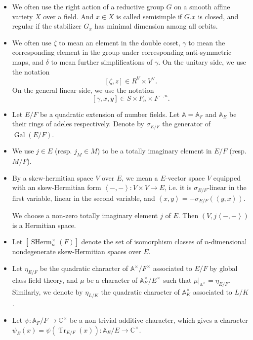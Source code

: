 \documentclass[11pt, reqno]{amsart}
\numberwithin{equation}{subsection}
\theoremstyle{plain}
\theoremstyle{definition}
\newcommand{\BA}{\mathbb A}
\newcommand{\BC}{\mathbb C}
\renewcommand{\AA}{\mathbb A}
\DeclareMathOperator{\Gal}{Gal}
\DeclareMathOperator{\SHerm}{SHerm}
\DeclareMathOperator{\Tr}{Tr}
\begin{document}
\begin{itemize}


\item We often use the right action of a reductive group $G$ on a smooth affine variety $X$ over a field. And $x \in X$ is called semisimple if $G.x$ is closed, and regular if the stabilizer $G_x$ has minimal dimension among all orbits. 

\item We often use $\zeta$ to mean an element in the double coset,  $\gamma$ to mean the corresponding element in the group under corresponding anti-symmetric maps, and $\delta$ to mean further simplifications of $\gamma$. On the unitary side, we use the notation
\[
[\zeta, z] \in R^{V} \times V^\vee.
\]
On the general linear side, we use the notation
\[
[\gamma, x, y] \in S \times F_n \times F^{-,n}.
\]

\item Let $E/F$ be a quadratic extension of number fields. Let $\BA=\BA_F$ and $\BA_E$ be their rings of adeles respectively. Denote by $\sigma_{E/F}$ the generator of $\Gal(E/F)$. 

\item We use $j \in E$ (resp. $j_M \in M$) to be a totally imaginary element in $E/F$ (resp. $M/F$).

\item By a skew-hermitian space $V$ over $E$, we mean a 
$E$-vector space $V$ equipped with an skew-Hermitian form $\left<-,-\right>: V \times V \to E$, 
i.e. it is $\sigma_{E/F}$-linear in the first variable, 
linear in the second variable, and 
$\left<x,y\right>=-\sigma_{E/F}(\left<y,x\right>)$. 

We choose a non-zero totally imaginary element $j$ of $E$. Then $(V, j\left<-,-\right>)$ is a Hermitian space.  

\item Let $[\SHerm_n^\times(F)]$ denote the set
of isomorphism classes of $n$-dimensional
nondegenerate skew-Hermitian spaces over $E$.

\item Let $\eta_{E/F}$ be the quadratic character of
$\AA^\times/F^\times$ associated to $E/F$ by
global class field theory, and $\mu$ be a character
of $\AA_E^\times/E^\times$ such that 
$\mu|_{\AA^\times} = \eta_{E/F}$. Similarly, we denote by $\eta_{L/K}$ the quadratic character of $\AA^\times_K$ associated to $L/K$.

\item Let $\psi: \BA_F / F \to \BC^\times$ be a non-trivial additive character, which gives a character $\psi_E(x)=\psi(\Tr_{E/F}(x)): \BA_E / E \to \BC^\times$.


\end{itemize}
\end{document}
